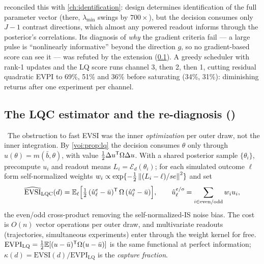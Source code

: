  reconciled this with \cref{ch:identification}: design determines identification of the full parameter vector (there, $\lambda_{\min}$ swings by $700\times$), but the decision consumes only $J-1$ contrast directions, which almost any powered readout informs through the posterior's correlations. Its diagnosis of \emph{why} the gradient criteria fail --- a large pulse is ``nonlinearly informative'' beyond the direction $g$, so no gradient-based score can see it --- was refuted by the extension (\cref{voi:sec:lqc}). A greedy scheduler with rank-1 updates and the LQ score runs channel 3, then 2, then 1, cutting residual quadratic EVPI to 69\%, 51\% and 36\% before saturating (34\%, 31\%): diminishing returns after one experiment per channel.

\subsection{The LQC estimator and the re-diagnosis ()}
\label{voi:sec:lqc}

\begin{construction}
\label{voi:con:lqc}
\tagTransported\ The obstruction to fast EVSI was the inner \emph{optimization} per outer draw, not the inner integration. By \cref{voi:prop:lq} the decision consumes $\theta$ only through $u(\theta) = m(\bar b,\theta)$, with value $\tfrac12\Delta u^{\mathsf{T}}\Omega\Delta u$. With a shared posterior sample $\{\theta_i\}$, precompute $u_i$ and readout means $L_i = \mathcal E_d(\theta_i)$; for each simulated outcome $\ell$ form self-normalized weights $w_i \propto \exp\{-\tfrac12\left\|(L_i - \ell)/se\right\|^2\}$ and set
\begin{equation}
\widehat{\mathrm{EVSI}}_{\mathrm{LQC}}(d) = \mathbb{E}_\ell\Big[\tfrac12\,(\hat u^{e}_\ell - \bar u)^{\mathsf{T}}\,\Omega\,(\hat u^{o}_\ell - \bar u)\Big], \qquad \hat u^{e/o}_\ell = \sum_{i \in \text{even/odd}} w_i u_i,
\label{voi:eq:lqc}
\end{equation}
the even/odd cross-product removing the self-normalized-IS noise bias. The cost is $O(n)$ vector operations per outer draw, and multivariate readouts (trajectories, simultaneous experiments) enter through the weight kernel for free. $\mathrm{EVPI}_{\mathrm{LQ}} = \tfrac12\mathbb{E}[(u-\bar u)^{\mathsf{T}}\Omega(u-\bar u)]$ is the same functional at perfect information; $\kappa(d) = \mathrm{EVSI}(d)/\mathrm{EVPI}_{\mathrm{LQ}}$ is the \emph{capture fraction}.
\end{construction}

